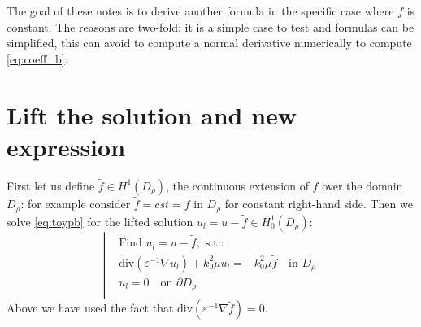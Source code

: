 \documentclass[11pt]{article}
\theoremstyle{plain}
\begin{document}
The goal of these notes is to derive another formula in the specific case where $f$ is constant. The reasons are two-fold: it is a simple case to test and formulas can be simplified, this can avoid to compute a normal derivative numerically to compute \eqref{eq:coeff_b}. \\

 
\section{Lift the solution and new expression}
First let us define $\tilde{f} \in H^1(D_\rho)$, the continuous extension of $f$ over the domain $D_\rho$: for example consider $\tilde{f}  = cst = f$ in $D_\rho$ for constant right-hand side. Then we solve \eqref{eq:toypb} for the lifted solution $u_l = u - \tilde{f} \in H^1_0(D_\rho)$:
\begin{equation}\label{eq:liftpb}
\left|
\begin{aligned}
&\text{Find } u_l = u -\tilde{f}, \text{ s.t.:} \\
&\displaystyle\text{div}\left(\varepsilon^{-1}\nabla u_l \right) + {k_0^2} \mu  u_l = - {k_0^2} \mu  \tilde{f} \quad \text{in } D_\rho \\
& u_l = 0 \quad \text{on } \partial D_\rho \\
\end{aligned}
\right.
\end{equation}
Above we have used the fact that $\text{div}\left(\varepsilon^{-1}\nabla \tilde{f} \right) = 0$.
\end{document}
